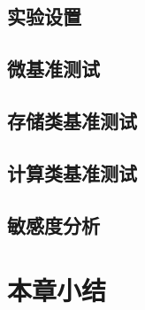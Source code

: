 \subsection{实验设置}

\subsection{微基准测试}

\subsection{存储类基准测试}

\subsection{计算类基准测试}

\subsection{敏感度分析}

\section{本章小结}

